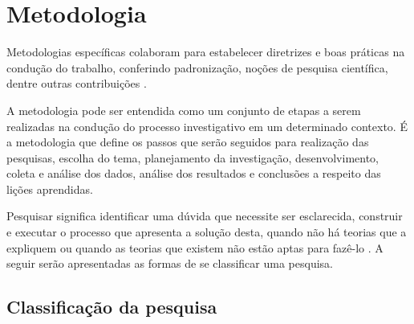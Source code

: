 \chapter{Metodologia}

Metodologias específicas colaboram para estabelecer diretrizes e boas práticas na condução do trabalho, conferindo padronização, noções de pesquisa científica, dentre outras contribuições \cite{Wohlin:2000}.

A metodologia pode ser entendida como um conjunto de etapas a serem realizadas na condução do processo investigativo em um determinado contexto. É a metodologia que define os passos que serão seguidos para realização das pesquisas, escolha do tema, planejamento da investigação, desenvolvimento, coleta e análise dos dados, análise dos resultados e conclusões a respeito das lições aprendidas\cite{Moresi:2003}.

Pesquisar significa identificar uma dúvida que necessite ser esclarecida, construir e executar o processo que apresenta a solução desta, quando não há teorias que a expliquem ou quando as teorias que existem não estão aptas para fazê-lo \cite{Koche:1997}. A seguir serão apresentadas as formas de se classificar uma pesquisa.

\section{Classificação da pesquisa}

